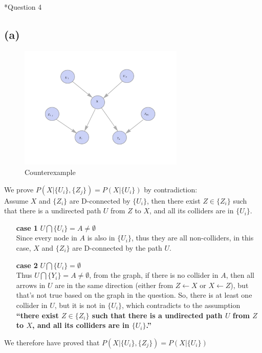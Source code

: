 \documentclass[12pt]{amsart}
\makeatletter
\renewcommand{\section}{\@startsection{section}{1}{0mm}
{-\baselineskip}{0.5\baselineskip}{\bf\leftline}}
\makeatother
\begin{document}
\section*{Question 4}
\subsection*{(a)}
\begin{figure}[h]
  \centering
  \includegraphics[width=0.7\textwidth]{pic.pdf}
  \caption{Counterexample}
\end{figure}

We prove $P(X|\{U_i\},\{Z_j\})=P(X|\{U_i\})$ by contradiction:\\
Assume $X$ and $\{Z_i\}$ are D-connected by $\{U_i\}$, then there exist $Z\in\{Z_i\}$
such that there is a undirected path $U$ from $Z$ to $X$, and all its colliders are in $\{U_i\}$.\\
\begin{enumerate}
\item[{\textbf{case 1}}] $U\bigcap \{U_i\}=A\neq\emptyset$\\
Since every node in $A$ is also in $\{U_i\}$, thus they are all non-colliders, in this case, 
$X$ and $\{Z_i\}$ are D-connected by the path $U$.

\item[{\textbf{case 2}}] $U\bigcap \{U_i\}=\emptyset$\\
Thus $U\bigcap \{Y_i\}=A\neq\emptyset$, from the graph, if there is no collider in $A$, then 
all arrows in $U$ are in the same direction (either from $Z\leftarrow X$ or $X\leftarrow Z$), but that's not true based on the graph in the question. So, there is at least one collider in $U$, but it is not in $\{U_i\}$, which contradicts to the assumption \textbf{“there exist $Z\in\{Z_i\}$
such that there is a undirected path $U$ from $Z$ to $X$, and all its colliders are in $\{U_i\}$.”}
\end{enumerate}
We therefore have proved that $P(X|\{U_i\},\{Z_j\})=P(X|\{U_i\})$
\end{document}
